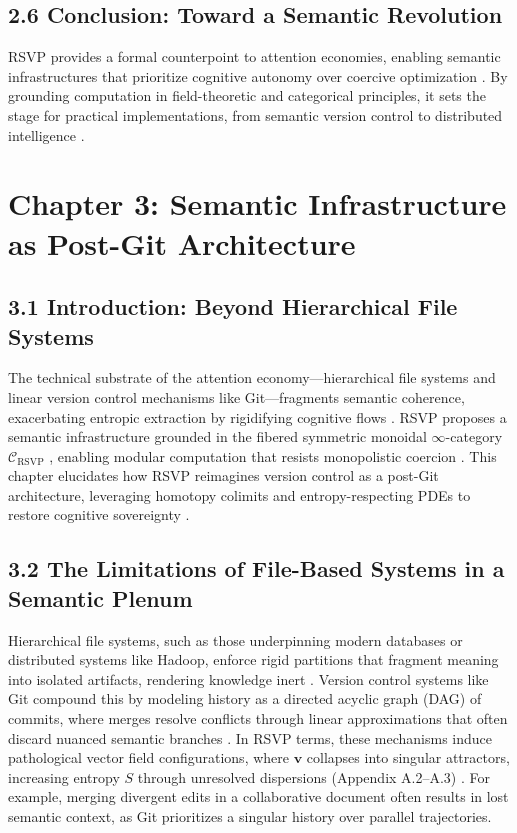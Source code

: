\documentclass[12pt]{article}
\begin{document}
\subsection*{2.6 Conclusion: Toward a Semantic Revolution}

RSVP provides a formal counterpoint to attention economies, enabling semantic infrastructures that prioritize cognitive autonomy over coercive optimization \citep{zuboff2019}. By grounding computation in field-theoretic and categorical principles, it sets the stage for practical implementations, from semantic version control to distributed intelligence \citep{deleuze1987, milewski2018}.

\section*{Chapter 3: Semantic Infrastructure as Post-Git Architecture}

\subsection*{3.1 Introduction: Beyond Hierarchical File Systems}

The technical substrate of the attention economy—hierarchical file systems and linear version control mechanisms like Git—fragments semantic coherence, exacerbating entropic extraction by rigidifying cognitive flows \citep{lanier2018, bird1988}. RSVP proposes a semantic infrastructure grounded in the fibered symmetric monoidal \(\infty\)-category \(\mathcal{C}_{\text{RSVP}}\) \citep{maclane1998}, enabling modular computation that resists monopolistic coercion \citep{zuboff2019}. This chapter elucidates how RSVP reimagines version control as a post-Git architecture, leveraging homotopy colimits and entropy-respecting PDEs to restore cognitive sovereignty \citep{ortega1957}.

\subsection*{3.2 The Limitations of File-Based Systems in a Semantic Plenum}

Hierarchical file systems, such as those underpinning modern databases or distributed systems like Hadoop, enforce rigid partitions that fragment meaning into isolated artifacts, rendering knowledge inert \citep{bird1988}. Version control systems like Git compound this by modeling history as a directed acyclic graph (DAG) of commits, where merges resolve conflicts through linear approximations that often discard nuanced semantic branches \citep{bird1988}. In RSVP terms, these mechanisms induce pathological vector field configurations, where \(\mathbf{v}\) collapses into singular attractors, increasing entropy \(S\) through unresolved dispersions (Appendix A.2–A.3) \citep{cover2006}. For example, merging divergent edits in a collaborative document often results in lost semantic context, as Git prioritizes a singular history over parallel trajectories.
\end{document}
